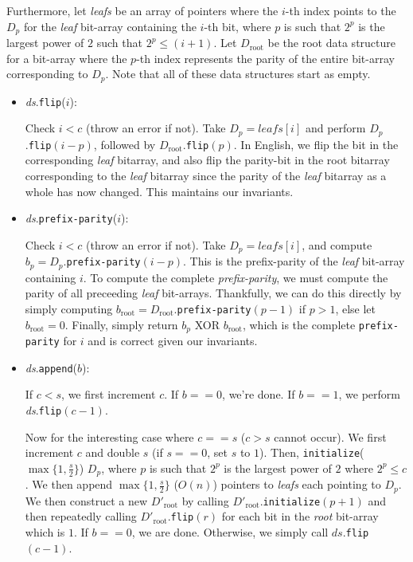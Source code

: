 \documentclass[12pt]{exam}
\newcommand*{\bigo}[1]{O \left( #1 \right)}
\begin{document}
\begin{questions}
\begin{solution}
Furthermore, let \textit{leafs} be an array of pointers where the $i$-th index points to the $D_p$ for the \textit{leaf} bit-array containing the $i$-th bit, where $p$ is such that $2^p$ is the largest power of $2$ such that $2^p \leq (i+1)$. Let $D_{\text{root}}$ be the root data structure for a bit-array where the $p$-th index represents the parity of the entire bit-array corresponding to $D_p$. Note that all of these data structures start as empty.


\begin{itemize}
  \item \textit{ds}.\texttt{flip}($i$):

  Check $i < c$ (throw an error if not). Take $D_p = \textit{leafs}[i]$ and perform $D_p$.\texttt{flip}$(i - p)$, followed by $D_{\text{root}}$.\texttt{flip}$(p)$. In English, we flip the bit in the corresponding \textit{leaf} bitarray, and also flip the parity-bit in the root bitarray corresponding to the \textit{leaf} bitarray since the parity of the \textit{leaf} bitarray as a whole has now changed. This maintains our invariants.

  \item \textit{ds}.\texttt{prefix-parity}($i$):

  Check $i < c$ (throw an error if not). Take $D_p = \textit{leafs}[i]$, and compute $b_p = D_p$.\texttt{prefix-parity}$(i - p)$. This is the prefix-parity of the \textit{leaf} bit-array containing $i$. To compute the complete \textit{prefix-parity}, we must compute the parity of all preceeding \textit{leaf} bit-arrays. Thankfully, we can do this directly by simply computing $b_{\text{root}} = D_{\text{root}}$.\texttt{prefix-parity}$(p-1)$ if $p > 1$, else let $b_{\text{root}} = 0$. Finally, simply return $b_p $ XOR $b_{\text{root}}$, which is the complete \texttt{prefix-parity} for $i$ and is correct given our invariants.
  
  \item \textit{ds}.\texttt{append}($b$):

    If $c < s$, we first increment $c$. If $b == 0$, we're done. If $b == 1$, we perform \textit{ds}.\texttt{flip}$(c-1)$. 

    Now for the interesting case where $c == s$ ($c > s$ cannot occur). We first increment $c$ and double $s$ (if $s == 0$, set $s$ to $1$). Then, \texttt{initialize}($\max\{1, \frac{s}{2} \}$) $D_p$, where $p$ is such that $2^p$ is the largest power of $2$ where $2^p \leq c$. We then append $\max\{1, \frac{s}{2}\}$ ($\bigo{n}$) pointers to \textit{leafs} each pointing to $D_p$. We then construct a new $D'_{\text{root}}$ by calling $D'_{\text{root}}$.\texttt{initialize}$(p + 1)$ and then repeatedly calling $D'_{\text{root}}$.\texttt{flip}$(r)$ for each bit in the \textit{root} bit-array which is $1$. If $b==0$, we are done. Otherwise, we simply call $\textit{ds}$.\texttt{flip}$(c-1)$.
\end{itemize}


\end{solution}
\end{questions}
\end{document}
